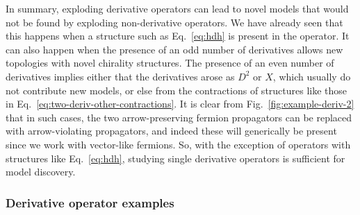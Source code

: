 In summary, exploding derivative operators can lead to novel models that would
not be found by exploding non-derivative operators. We have already seen that
this happens when a structure such as Eq.~\eqref{eq:hdh} is present in the
operator. It can also happen when the presence of an odd number of derivatives
allows new topologies with novel chirality structures. The presence of an even
number of derivatives implies either that the derivatives arose as $D^{2}$ or
$X$, which usually do not contribute new models, or else from the contractions
of structures like those in Eq.~\eqref{eq:two-deriv-other-contractions}. It is
clear from Fig.~\ref{fig:example-deriv-2} that in such cases, the two
arrow-preserving fermion propagators can be replaced with arrow-violating
propagators, and indeed these will generically be present since we work with
vector-like fermions. So, with the exception of operators with structures like
Eq.~\eqref{eq:hdh}, studying single derivative operators is sufficient for model
discovery.

\subsubsection{Derivative operator examples}
\label{sec:deriv-op-examples}

